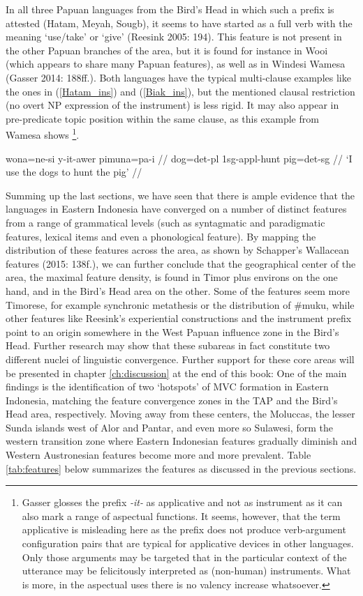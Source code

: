 In all three Papuan languages from the Bird's Head in which such a prefix is attested (Hatam, Meyah, Sougb), it seems to have started as a full verb with the meaning `use/take' or `give' (Reesink 2005: 194). This feature is not present in the other Papuan branches of the area, but it is found for instance in Wooi (which appears to share many Papuan features), as well as in Windesi Wamesa (Gasser 2014: 188ff.). Both languages have the typical multi-clause examples like the ones in (\ref{Hatam_ins}) and (\ref{Biak_ins}), but the mentioned clausal restriction (no overt NP expression of the instrument) is less rigid. It may also appear in pre-predicate topic position within the same clause, as this example from Wamesa shows \footnote{Gasser glosses the prefix \textit{-it-} as applicative and not as instrument as it can also mark a range of aspectual functions. It seems, however, that the term applicative is misleading here as the prefix does not produce verb-argument configuration pairs that are typical for applicative devices in other languages. Only those arguments may be targeted that in the particular context of the utterance may be felicitously interpreted as (non-human) instruments. What is more, in the aspectual uses there is no valency increase whatsoever.}.

\ex \label{}
\begingl
\gla wona=ne-si y-it-awer pimuna=pa-i // 
\glb dog=\acs{det}-\acs{pl} \acs{1}\acs{sg}-\acs{appl}-hunt pig=\acs{det}-\acs{sg} //
\glft `I use the dogs to hunt the pig' // 
\endgl
\xe

Summing up the last sections, we have seen that there is ample evidence that the languages in Eastern Indonesia have converged on a number of distinct features from a range of grammatical levels (such as syntagmatic and paradigmatic features, lexical items and even a phonological feature). By mapping the distribution of these features across the area, as shown by Schapper's Wallacean features (2015:  138f.), we can further conclude that the geographical center of the area, the maximal feature density, is found in Timor plus environs on the one hand, and in the Bird's Head area on the other. Some of the features seem more Timorese, for example synchronic metathesis or the distribution of \#muku, while other features like Reesink's experiential constructions and the instrument prefix point to an origin somewhere in the West Papuan influence zone in the Bird's Head. Further research may show that these subareas in fact constitute two different nuclei of linguistic convergence. Further support for these core areas will be presented in chapter \ref{ch:discussion} at the end of this book: One of the main findings is the identification of two `hotspots' of MVC formation in Eastern Indonesia, matching the feature convergence zones in the TAP and the Bird's Head area, respectively. Moving away from these centers, the Moluccas, the lesser Sunda islands west of Alor and Pantar, and even more so Sulawesi, form the western transition zone where Eastern Indonesian features gradually diminish and Western Austronesian features become more and more prevalent. Table \ref{tab:features} below summarizes the features as discussed in the previous sections.

